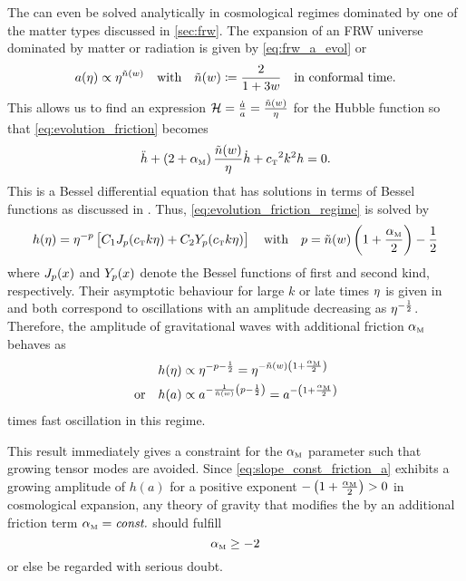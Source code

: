 \documentclass[12pt,parskip=half]{scrreprt}
\begin{document}
The  can even be solved analytically in cosmological regimes dominated by one of the matter types discussed in \autoref{sec:frw}. The expansion of an FRW universe dominated by matter or radiation is given by \eqref{eq:frw_a_evol} or
\begin{equation}
	a(\eta) \propto \eta^{\tilde{n}(w)} \quad \text{with} \quad \tilde{n}(w) \coloneqq \frac{2}{1+3w} \quad \text{in conformal time.}
\end{equation}
This allows us to find an expression \(\mathcal{H} = \frac{\dot{a}}{a} = \frac{\tilde{n}(w)}{\eta}\) for the Hubble function so that \eqref{eq:evolution_friction} becomes
\begin{equation}\label{eq:evolution_friction_regime}
	\ddconf{h} + \del{2 + \alphaM} \frac{\nexpconft}{\conft} \dconf{h} + \cT^2 k^2 h = 0
	\eqpunct{.}
\end{equation}
This is a Bessel differential equation that has solutions in terms of Bessel functions as discussed in . Thus, \eqref{eq:evolution_friction_regime} is solved by
\begin{equation}
	h(\conft) = \conft^{-p} \sbr{C_1 \besselJ_p(\cT k \conft) + C_2 \besselY_p(\cT k \conft)} \quad \text{with} \quad p = \nexpconft\del{1 + \frac{\alphaM}{2}}-\frac{1}{2}
\end{equation}
where \(J_p(x)\) and \(Y_p(x)\) denote the Bessel functions of first and second kind, respectively. Their asymptotic behaviour for large \(k\) or late times \(\eta\) is given in  and both correspond to oscillations with an amplitude decreasing as \(\eta^{-\frac{1}{2}}\). Therefore, the amplitude of gravitational waves with additional friction \({\alpha_{\textnormal{\tiny{M}}}}\) behaves as
\begin{subequations}\label{eq:slope_const_friction}
\begin{align}
	h(\conft) &\propto \conft^{-p-\frac{1}{2}} = \conft^{-\nexpconft\del{1+\frac{\alphaM}{2}}} \\
	\text{or} \quad h(a) &\propto a^{-\frac{1}{\nexpconft}\del{p-\frac{1}{2}}} = a^{-\del{1+\frac{\alphaM}{2}}} \label{eq:slope_const_friction_a}
\end{align}
\end{subequations}
times fast oscillation in this regime.

This result immediately gives a constraint for the \({\alpha_{\textnormal{\tiny{M}}}}\) parameter such that growing tensor modes are avoided. Since \eqref{eq:slope_const_friction_a} exhibits a growing amplitude of \(h(a)\) for a positive exponent \(-\del{1+\frac{\alphaM}{2}} > 0\) in cosmological expansion, any theory of gravity that modifies the  by an additional friction term \({\alpha_{\textnormal{\tiny{M}}}}=\textnormal{\textit{const.}}\) should fulfill
\begin{equation}\label{eq:grow_cond_const_fric}
	{\alpha_{\textnormal{\tiny{M}}}} \geq -2
\end{equation}
or else be regarded with serious doubt. 
\end{document}
